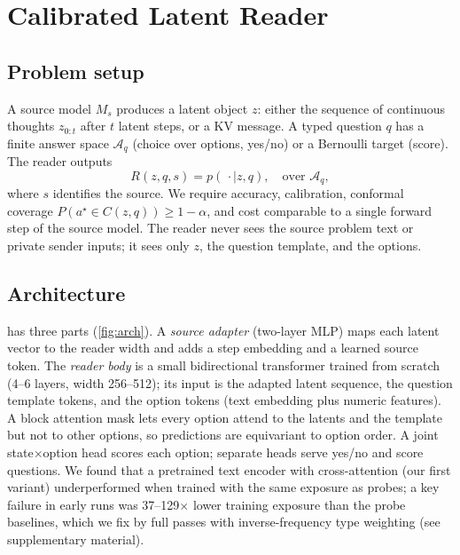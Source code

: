 \section{Calibrated Latent Reader}
\label{sec:method}

\subsection{Problem setup}
A source model $M_s$ produces a latent object $z$: either the sequence of continuous thoughts $z_{0:t}$ after $t$ latent steps, or a KV message. A typed question $q$ has a finite answer space $\mathcal{A}_q$ (choice over options, yes/no) or a Bernoulli target (score). The reader outputs
\begin{equation}
R(z, q, s) = p(\,\cdot \mid z, q),\quad \text{over } \mathcal{A}_q,
\end{equation}
where $s$ identifies the source. We require accuracy, calibration, conformal coverage $P(a^\star \in C(z,q)) \ge 1-\alpha$, and cost comparable to a single forward step of the source model. The reader never sees the source problem text or private sender inputs; it sees only $z$, the question template, and the options.

\subsection{Architecture}
\clr{} has three parts (\cref{fig:arch}). A \emph{source adapter} (two-layer MLP) maps each latent vector to the reader width and adds a step embedding and a learned source token. The \emph{reader body} is a small bidirectional transformer trained from scratch (4--6 layers, width 256--512); its input is the adapted latent sequence, the question template tokens, and the option tokens (text embedding plus numeric features). A block attention mask lets every option attend to the latents and the template but not to other options, so predictions are equivariant to option order. A joint state$\times$option head scores each option; separate heads serve yes/no and score questions. We found that a pretrained text encoder with cross-attention (our first variant) underperformed when trained with the same exposure as probes; a key failure in early runs was 37--129$\times$ lower training exposure than the probe baselines, which we fix by full passes with inverse-frequency type weighting (see supplementary material).



